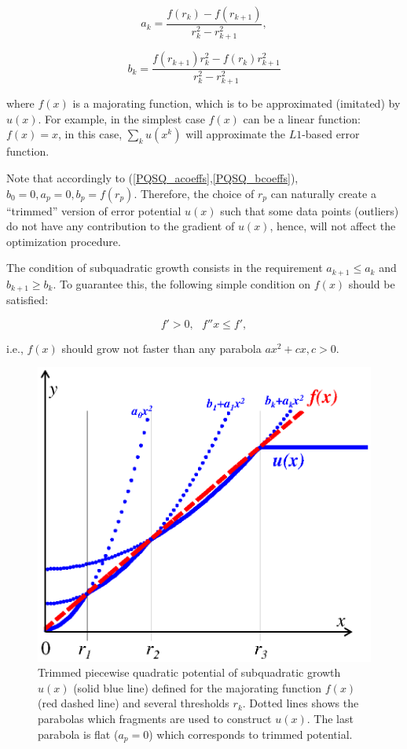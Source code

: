 \documentclass[preprint,12pt,twocolumn]{elsarticle}
\begin{document}
\begin{equation}\label{PQSQ_acoeffs}
a_k = \frac{f(r_k)-f(r_{k+1})}{r_k^2-r_{k+1}^2},
\end{equation}

\begin{equation}\label{PQSQ_bcoeffs}
b_k = \frac{f(r_{k+1})r_k^2-f(r_{k})r_{k+1}^2}{r_k^2-r_{k+1}^2}
\end{equation}

\noindent where $f(x)$ is a majorating function, which is to be approximated (imitated) by $u(x)$. For example, in the simplest case $f(x)$ can be a linear function: $f(x)=x$, in this case, $\sum_k u(x^k)$ will approximate the $L1$-based error function.

Note that accordingly to (\ref{PQSQ_acoeffs},\ref{PQSQ_bcoeffs}), $b_0=0, a_p=0, b_p=f(r_p)$. Therefore, the choice of $r_p$ can naturally create a ``trimmed'' version of error potential $u(x)$ such that some data points (outliers) do not have any contribution to the gradient of $u(x)$, hence, will not affect the optimization procedure.

The condition of subquadratic growth consists in the requirement $a_{k+1}\leq a_{k}$ and $b_{k+1} \geq b_{k}$. To guarantee this, the following simple condition on $f(x)$ should be satisfied:

\begin{equation}
\label{eq:condition_function}
f'>0, \>\>\> f''x \leq f',
\end{equation}

\noindent i.e., $f(x)$ should grow not faster than any parabola $ax^2+cx, c>0$.

\begin{figure}[h]
\centering\includegraphics[width=0.9\linewidth]{potential.eps}
\caption{Trimmed piecewise quadratic potential of subquadratic growth $u(x)$ (solid blue line) defined for the majorating function $f(x)$ (red dashed line) and several thresholds $r_k$. Dotted lines shows the parabolas which fragments are used to construct $u(x)$. The last parabola is flat ($a_p=0$) which corresponds to trimmed potential. \label{potential}}
\end{figure}
\end{document}
